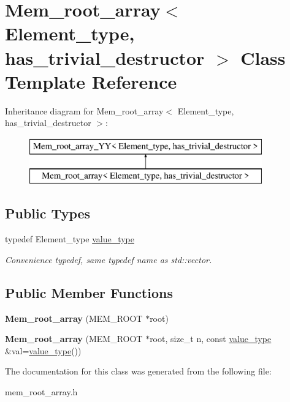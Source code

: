 \hypertarget{classMem__root__array}{}\section{Mem\+\_\+root\+\_\+array$<$ Element\+\_\+type, has\+\_\+trivial\+\_\+destructor $>$ Class Template Reference}
\label{classMem__root__array}
Inheritance diagram for Mem\+\_\+root\+\_\+array$<$ Element\+\_\+type, has\+\_\+trivial\+\_\+destructor $>$\+:\begin{figure}[H]
\begin{center}
\leavevmode
\includegraphics[height=2.000000cm]{classMem__root__array}
\end{center}
\end{figure}
\subsection*{Public Types}
\begin{DoxyCompactItemize}
\item 
\mbox{\label{classMem__root__array_acf8e1e9df471910f262a0fd77c9a752e}} 
typedef Element\+\_\+type \mbox{\hyperlink{classMem__root__array_acf8e1e9df471910f262a0fd77c9a752e}{value\+\_\+type}}
\begin{DoxyCompactList}\small\item\em Convenience typedef, same typedef name as std\+::vector. \end{DoxyCompactList}\end{DoxyCompactItemize}
\subsection*{Public Member Functions}
\begin{DoxyCompactItemize}
\item 
\mbox{\label{classMem__root__array_a42a2c8b1fc8d462563f988a2ebe40465}} 
{\bfseries Mem\+\_\+root\+\_\+array} (M\+E\+M\+\_\+\+R\+O\+OT $\ast$root)
\item 
\mbox{\label{classMem__root__array_a8cfb9c5aa08096f61d78dc5a045c5a8d}} 
{\bfseries Mem\+\_\+root\+\_\+array} (M\+E\+M\+\_\+\+R\+O\+OT $\ast$root, size\+\_\+t n, const \mbox{\hyperlink{classMem__root__array__YY_a7cd544d399ee0cf1ac196fbf0da8b3ff}{value\+\_\+type}} \&val=\mbox{\hyperlink{classMem__root__array__YY_a7cd544d399ee0cf1ac196fbf0da8b3ff}{value\+\_\+type}}())
\end{DoxyCompactItemize}


The documentation for this class was generated from the following file\+:\begin{DoxyCompactItemize}
\item 
mem\+\_\+root\+\_\+array.\+h\end{DoxyCompactItemize}
